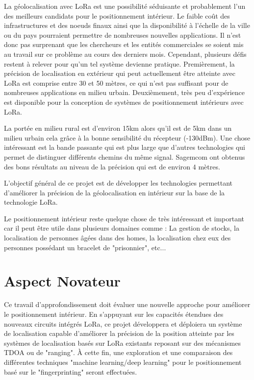 La géolocalisation avec LoRa est une possibilité séduisante et probablement l'un des meilleurs candidats pour le positionnement intérieur. Le faible coût des infrastructures et des noeuds finaux ainsi que la disponibilité à l'échelle de la ville ou du pays pourraient permettre de nombreuses nouvelles applications. Il n’est donc pas surprenant que les chercheurs et les entités commerciales se soient mis au travail sur ce problème au cours des derniers mois. Cependant, plusieurs défis restent à relever pour qu'un tel système devienne pratique.
Premièrement, la précision de localisation en extérieur qui peut actuellement être atteinte avec LoRa est comprise entre 30 et 50 mètres, ce qui n’est pas suffisant pour de nombreuses applications en milieu urbain. Deuxièmement, très peu d’expérience est disponible pour la conception de systèmes de positionnement intérieurs avec LoRa.

La portée en milieu rural est d'environ 15km alors qu'il est de 5km dans un milieu urbain cela grâce à la bonne sensibilité du récepteur (-130dBm). Une chose intéressant est la bande passante qui est plus large que d'autres technologies qui permet de distinguer différents chemins du même signal. Sagemcom ont obtenus des bons résultats au niveau de la précision qui est de environ 4 mètres.\cite{ML_indoor} 

L’objectif général de ce projet est de développer les technologies permettant d'améliorer la précision de la géolocalisation en intérieur sur la base de la technologie LoRa. 

Le positionnement intérieur reste quelque chose de très intéressant et important car il peut être utile dans plusieurs domaines comme : La gestion de stocks, la localisation de personnes âgées dans des homes, la localisation chez eux des personnes possédant un bracelet de "prisonnier", etc...

\section{Aspect Novateur}
Ce travail d'approfondissement doit évaluer une nouvelle approche pour améliorer le positionnement intérieur. En s'appuyant sur les capacités étendues des nouveaux circuits intégrés LoRa, ce projet développera et déploiera un système de localisation capable d'améliorer la précision de la position atteinte par les systèmes de localisation basés sur LoRa existants reposant sur des mécanismes TDOA ou de "ranging". À cette fin, une exploration et une comparaison des différentes techniques "machine learning/deep learning" pour le positionnement basé sur le "fingerprinting" seront effectuées.

